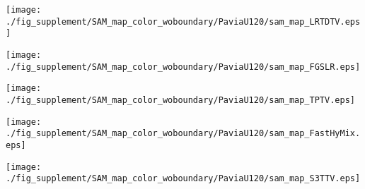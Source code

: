 \begin{figure*}[t]
\begin{center}
		\begin{minipage}{0.15\hsize}
			\centerline{\hspace{\hsize}} %
		\end{minipage}
		\begin{minipage}{0.15\hsize}
			\centerline{\texttt{[image: ./fig\_supplement/SAM\_map\_color\_woboundary/PaviaU120/sam\_map\_LRTDTV.eps]}} %
		\end{minipage}
		\begin{minipage}{0.15\hsize}
			\centerline{\texttt{[image: ./fig\_supplement/SAM\_map\_color\_woboundary/PaviaU120/sam\_map\_FGSLR.eps]}} %
		\end{minipage}
		\begin{minipage}{0.15\hsize}
			\centerline{\texttt{[image: ./fig\_supplement/SAM\_map\_color\_woboundary/PaviaU120/sam\_map\_TPTV.eps]}} %
		\end{minipage}
		\begin{minipage}{0.15\hsize}
			\centerline{\texttt{[image: ./fig\_supplement/SAM\_map\_color\_woboundary/PaviaU120/sam\_map\_FastHyMix.eps]}} %
		\end{minipage}
		\begin{minipage}{0.15\hsize}
			\centerline{\texttt{[image: ./fig\_supplement/SAM\_map\_color\_woboundary/PaviaU120/sam\_map\_S3TTV.eps]}} %
		\end{minipage}
		\begin{minipage}{0.050\hsize}
			\centerline{\hspace{\hsize}} %
		\end{minipage}
		
		
		\vspace{1mm}
		

\end{center}
\end{figure*}
